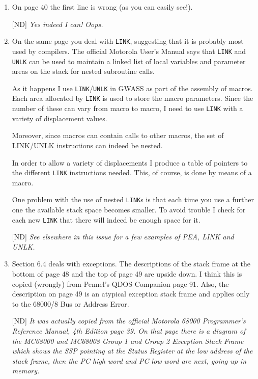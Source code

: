 \begin{enumerate}
[ND] \emph{I did cover these in the book, at least the part about needing two instructions, and a register.}

\item On page 40 the first line is wrong (as you can easily see!).

[ND] \emph{Yes indeed I can! Oops.}

\item On the same page you deal with \texttt{LINK}, suggesting that it is probably most used by compilers. The official Motorola User's Manual says that \texttt{LINK} and \texttt{UNLK} can be used to maintain a linked list of local variables and parameter areas on the stack for nested subroutine calls. 

As it happens I use \texttt{LINK}/\texttt{UNLK} in GWASS as part of the assembly of macros. Each area allocated by \texttt{LINK} is used to store the macro parameters. Since the number of these can vary from macro to macro, I need to use \texttt{LINK} with a variety of displacement values.

Moreover, since macros can contain calls to other macros, the set of
LINK/UNLK instructions can indeed be nested.

In order to allow a variety of displacements I produce a table of pointers to the different \texttt{LINK} instructions needed. This, of course, is done by means of a macro.

One problem with the use of nested \texttt{LINK}s is that each time you use a further one the available stack space becomes smaller. To avoid trouble I check for each new \texttt{LINK} that there will indeed be enough space for it.

[ND] \emph{See elsewhere in this issue for a few examples of PEA, LINK and UNLK.}

\item Section 6.4 deals with exceptions. The descriptions of the stack frame at the bottom of page 48 and the top of page 49 are upside down. I think this is copied (wrongly) from Pennel's QDOS Companion page 91. Also, the description on page 49 is an atypical exception stack frame and applies only to the 68000/8 Bus or Address Error.

[ND] \emph{It was actually copied from the official Motorola 68000 Programmer's Reference Manual, 4th Edition page 39. On that page there is a diagram of the MC68000 and MC68008 Group 1 and Group 2 Exception Stack Frame which shows the SSP pointing at the Status Register at the low address of the stack frame, then the PC high word and PC low word are next, going up in memory.}


\end{enumerate}
